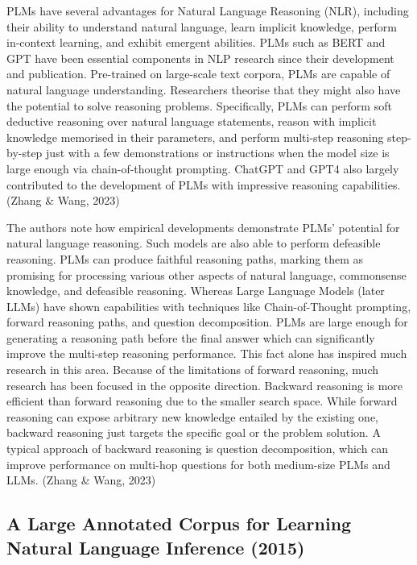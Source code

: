 \documentclass[fleqn,moreauthors,10pt]{ds_report}
\begin{document}
PLMs have several advantages for Natural Language Reasoning (NLR), including their ability to understand natural language, learn implicit knowledge, perform in-context learning, and exhibit emergent abilities. PLMs such as BERT and GPT have been essential components in NLP research since their development and publication. Pre-trained on large-scale text corpora, PLMs are capable of natural language understanding. Researchers theorise that they might also have the potential to solve reasoning problems. Specifically, PLMs can perform soft deductive reasoning over natural language statements, reason with implicit knowledge memorised in their parameters, and perform multi-step reasoning step-by-step just with a few demonstrations or instructions when the model size is large enough via chain-of-thought prompting. ChatGPT and GPT4 also largely contributed to the development of PLMs with impressive reasoning capabilities. (Zhang \& Wang, 2023)

The authors note how empirical developments demonstrate PLMs' potential for natural language reasoning. Such models are also able to perform defeasible reasoning. PLMs can produce faithful reasoning paths, marking them as promising for processing various other aspects of natural language, commonsense knowledge, and defeasible reasoning. Whereas Large Language Models (later LLMs) have shown capabilities with techniques like Chain-of-Thought prompting, forward reasoning paths, and question decomposition. PLMs are large enough for generating a reasoning path before the final answer which can significantly improve the multi-step reasoning performance. This fact alone has inspired much research in this area. Because of the limitations of forward reasoning, much research has been focused in the opposite direction. Backward reasoning is more efficient than forward reasoning due to the smaller search space. While forward reasoning can expose arbitrary new knowledge entailed by the existing one, backward reasoning just targets the specific goal or the problem solution. A typical approach of backward reasoning is question decomposition, which can improve performance on multi-hop questions for both medium-size PLMs and LLMs. (Zhang \& Wang, 2023)

\subsection*{A Large Annotated Corpus for Learning Natural Language Inference (2015)}
\end{document}
